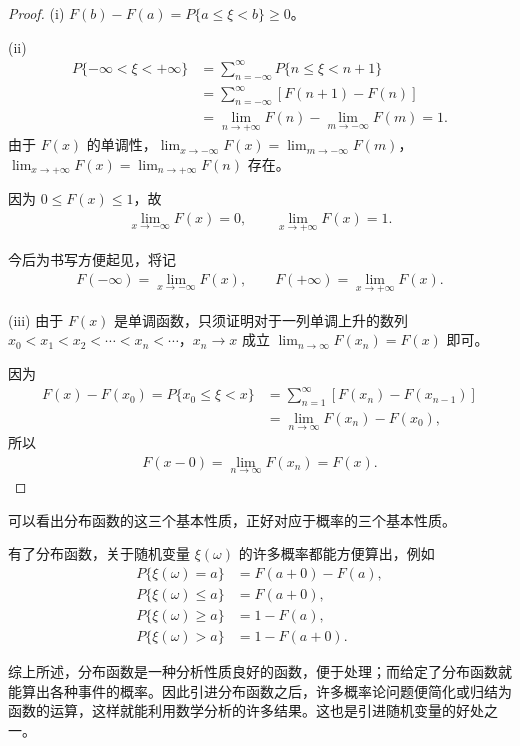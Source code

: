 \documentclass[../../main.tex]{subfiles}
\begin{document}
\begin{proof}
(i) $F(b)-F(a)=P\{a\leqslant\xi<b\}\geqslant 0$。

(ii) 
\begin{align*}
P\{-\infty<\xi<+\infty\}
&=\sum_{n=-\infty}^{\infty}P\{n\leqslant\xi<n+1\}\\
&=\sum_{n=-\infty}^{\infty}[F(n+1)-F(n)]\\
&=\lim_{n\to+\infty}F(n)-\lim_{m\to-\infty}F(m)=1.
\end{align*}
由于 $F(x)$ 的单调性，$\lim_{x\to-\infty}F(x)=\lim_{m\to-\infty}F(m)$，$\lim_{x\to+\infty}F(x)=\lim_{n\to+\infty}F(n)$ 存在。

因为 $0\leqslant F(x)\leqslant 1$，故
\begin{align*}\lim_{x\to-\infty}F(x)=0,\qquad \lim_{x\to+\infty}F(x)=1.\end{align*}

今后为书写方便起见，将记
\begin{align}
F(-\infty)=\lim_{x\to-\infty}F(x),\qquad F(+\infty)=\lim_{x\to+\infty}F(x).\label{align:ch03-分布函数正负无穷}
\end{align}

(iii) 由于 $F(x)$ 是单调函数，只须证明对于一列单调上升的数列 $x_0<x_1<x_2<\cdots<x_n<\cdots$，$x_n\to x$ 成立 $\lim_{n\to\infty}F(x_n)=F(x)$ 即可。

因为
\begin{align*}
F(x)-F(x_0)=P\{x_0\leqslant\xi<x\}&=\sum_{n=1}^{\infty}[F(x_n)-F(x_{n-1})]\\
&=\lim_{n\to\infty}F(x_n)-F(x_0),
\end{align*}
所以
\begin{align*}F(x-0)=\lim_{n\to\infty}F(x_n)=F(x).\end{align*}
\end{proof}

可以看出分布函数的这三个基本性质，正好对应于概率的三个基本性质。

有了分布函数，关于随机变量 $\xi(\omega)$ 的许多概率都能方便算出，例如
\begin{align*}
P\{\xi(\omega)=a\}&=F(a+0)-F(a),\\
P\{\xi(\omega)\leqslant a\}&=F(a+0),\\
P\{\xi(\omega)\geqslant a\}&=1-F(a),\\
P\{\xi(\omega)>a\}&=1-F(a+0).
\end{align*}

综上所述，分布函数是一种分析性质良好的函数，便于处理；而给定了分布函数就能算出各种事件的概率。因此引进分布函数之后，许多概率论问题便简化或归结为函数的运算，这样就能利用数学分析的许多结果。这也是引进随机变量的好处之一。
\end{document}
